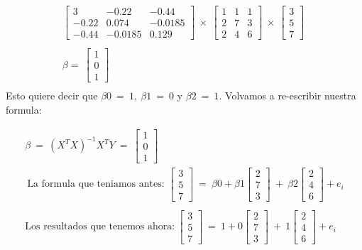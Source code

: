 \documentclass[10pt]{article}
\begin{document}
\begin{gather*}
\begin{bmatrix}
3 & -0.22 & -0.44\\
-0.22 & 0.074 & -0.0185\\
-0.44 & -0.0185 & 0.129
\end{bmatrix} \ \times \ \begin{bmatrix}
1 & 1 & 1\\
2 & 7 & 3\\
2 & 4 & 6
\end{bmatrix} \ \times \ \begin{bmatrix}
3\\
5\\
7
\end{bmatrix} \ \\
\\
\beta =\ \begin{bmatrix}
1\\
0\\
1
\end{bmatrix}\\
\end{gather*}
Esto quiere decir que $\displaystyle \beta 0\ =\ 1,\ \beta 1\ =\ 0$ y $\displaystyle \beta 2\ =\ 1$. Volvamos a re-escribir nuestra formula:




\begin{gather*}
\beta \ =\ \left( X^{T} X\right)^{-1} X^{T} Y\ =\ \begin{bmatrix}
1\\
0\\
1
\end{bmatrix}\\
\ \text{La formula que teniamos antes: }\begin{bmatrix}
3\\
5\\
7
\end{bmatrix} \ =\ \beta 0+\beta 1\begin{bmatrix}
2\\
7\\
3
\end{bmatrix} \ +\ \beta 2\begin{bmatrix}
2\\
4\\
6
\end{bmatrix} +e_{i}\\
\\
\text{Los resultados que tenemos ahora:} \ \begin{bmatrix}
3\\
5\\
7
\end{bmatrix} \ =\ 1+0\begin{bmatrix}
2\\
7\\
3
\end{bmatrix} \ +\ 1\begin{bmatrix}
2\\
4\\
6
\end{bmatrix} +e_{i}\\
\end{gather*}
\end{document}
